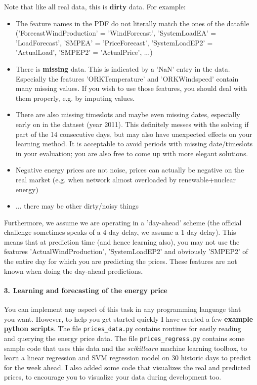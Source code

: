 \documentclass[a4,10pt]{article}
\begin{document}
Note that like all real data, this is \textbf{dirty} data. For example:
\begin{itemize}
\item The feature names in the PDF do not literally match the ones of the datafile ('ForecastWindProduction' = 'WindForecast', 'SystemLoadEA' = 'LoadForecast', 'SMPEA' = 'PriceForecast', 'SystemLoadEP2' = 'ActualLoad', 'SMPEP2' = 'ActualPrice', ...)
\item There is \textbf{missing} data. This is indicated by a 'NaN' entry in the data. Especially the features 'ORKTemperature' and 'ORKWindspeed' contain many missing values. If you wish to use those features, you should deal with them properly, e.g. by imputing values.
\item There are also missing timeslots and maybe even missing dates, especially early on in the dataset (year 2011). This definitely messes with the solving if part of the 14 consecutive days, but may also have unexpected effects on your learning method. It is acceptable to avoid periods with missing date/timeslots in your evaluation; you are also free to come up with more elegant solutions.
\item Negative energy prices are not noise, prices can actually be negative on the real market (e.g. when network almost overloaded by renewable+nuclear energy)
\item ... there may be other dirty/noisy things
\end{itemize}

Furthermore, we assume we are operating in a 'day-ahead' scheme (the official challenge sometimes speaks of a 4-day delay, we assume a 1-day delay). This means that at prediction time (and hence learning also), you may not use the features 'ActualWindProduction', 'SystemLoadEP2' and obviously 'SMPEP2' of the entire day for which you are predicting the prices. These features are not known when doing the day-ahead predictions.


\paragraph{3. Learning and forecasting of the energy price}
You can implement any aspect of this task in any programming language that you want. However, to help you get started quickly I have created a few \textbf{example python scripts}. The file \texttt{prices\_data.py} contains routines for easily reading and querying the energy price data. The file \texttt{prices\_regress.py} contains some sample code that uses this data and the \textit{scikitlearn} machine learning toolbox, to learn a linear regression and SVM regression model on 30 historic days to predict for the week ahead. I also added some code that visualizes the real and predicted prices, to encourage you to visualize your data during development too.
\end{document}
